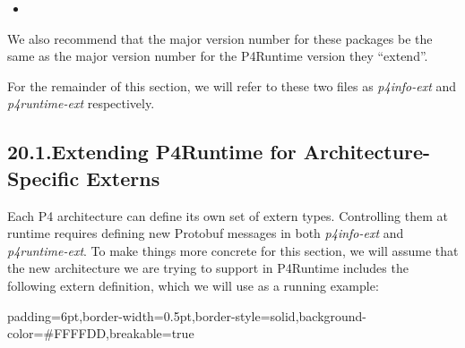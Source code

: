 \documentclass[11pt]{article}
\begin{document}
{\begin{itemize}[noitemsep,topsep=\mdcompacttopsep]
\item{}%
\end{itemize}%

\noindent{}We also recommend that the major version number for these packages be the same
as the major version number for the P4Runtime version they \textquotedblleft{}extend\textquotedblright{}.%

For the remainder of this section, we will refer to these two files as
\emph{p4info-ext} and \emph{p4runtime-ext} respectively.%

\subsection{20.1.\hspace*{0.5em}Extending P4Runtime for Architecture-Specific Externs}\label{sec-extending-p4runtime-for-architecture-specific-externs}%

\noindent{}Each P4 architecture can define its own set of extern types. Controlling them at
runtime requires defining new Protobuf messages in both \emph{p4info-ext} and
\emph{p4runtime-ext}. To make things more concrete for this section, we will assume
that the new architecture we are trying to support in P4Runtime includes the
following extern definition, which we will use as a running example:%

\begin{mdbmargintb}{6pt}{6pt}%
\begin{mdblock}{padding=6pt,border-width=0.5pt,border-style=solid,background-color=\#FFFFDD,breakable=true}%
\begin{mdpre}%
\end{mdpre}%
\end{mdblock}%
\end{mdbmargintb}%

}
\end{document}
